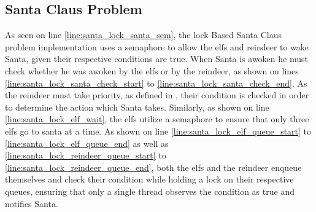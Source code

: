 \subsection{Santa Claus Problem}
As seen on line \ref{line:santa_lock_santa_sem}, the lock Based Santa Claus problem implementation uses a semaphore to allow the elfs and reindeer to wake Santa, given their respective conditions are true. When Santa is awoken he must check whether he was awoken by the elfs or by the reindeer, as shown on lines \ref{line:santa_lock_santa_check_start} to \ref{line:santa_lock_santa_check_end}. As the reindeer must take priority, as defined in , their condition is checked in order to determine the action which Santa takes. Similarly, as shown on line \ref{line:santa_lock_elf_wait}, the elfs utilize a semaphore to ensure that only three elfs go to santa at a time. As shown on line \ref{line:santa_lock_elf_queue_start} to \ref{line:santa_lock_elf_queue_end} as well as \ref{line:santa_lock_reindeer_queue_start} to \ref{line:santa_lock_reindeer_queue_end}, both the elfs and the reindeer enqueue themselves and check their condition while holding a lock on their respective queues, ensuring that only a single thread observes the condition as true and notifies Santa.

